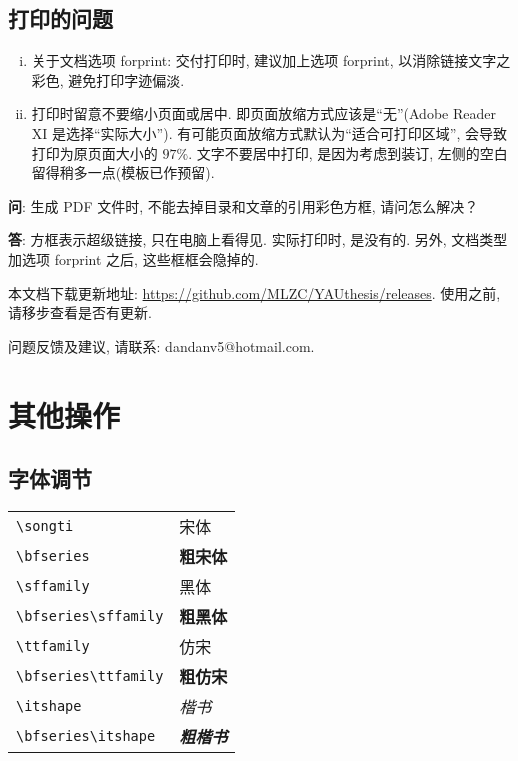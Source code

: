 \documentclass[forprint]{YAUthesis}
\begin{document}
\section{打印的问题}
\begin{enumerate}[i)]
  \item  关于文档选项 forprint: 交付打印时, 建议加上选项 forprint, 以消除链接文字之彩色, 避免打印字迹偏淡.
  \item  打印时留意不要缩小页面或居中. 即页面放缩方式应该是``无''(Adobe Reader XI 是选择``实际大小'').
           有可能页面放缩方式默认为``适合可打印区域'', 会导致打印为原页面大小的 $97\%$.
           文字不要居中打印, 是因为考虑到装订, 左侧的空白留得稍多一点(模板已作预留).
\end{enumerate}

\textbf{问}: {\kaishu 生成 PDF 文件时, 不能去掉目录和文章的引用彩色方框, 请问怎么解决？}

\textbf{答}: {\kaishu 方框表示超级链接, 只在电脑上看得见. 实际打印时, 是没有的. 另外, 文档类型加选项 forprint 之后, 这些框框会隐掉的. }

 \vfill

本文档下载更新地址: \url{https://github.com/MLZC/YAUthesis/releases}. 使用之前, 请移步查看是否有更新.

问题反馈及建议, 请联系: dandanv5@hotmail.com.



\chapter{其他操作}


 \section{字体调节}

\begin{tabular}{ll}
	\verb|\songti|   & {\songti 宋体}   \\
	\verb|\bfseries|    & {\bfseries 粗宋体}    \\
	\verb|\sffamily| & {\sffamily 黑体} \\
	\verb|\bfseries\sffamily| & {\bfseries\sffamily 粗黑体} \\
  \verb|\ttfamily|   & {\ttfamily 仿宋}   \\
  \verb|\bfseries\ttfamily|   & {\bfseries\ttfamily 粗仿宋}   \\
  \verb|\itshape|   & {\itshape 楷书}   \\
  \verb|\bfseries\itshape|   & {\bfseries\itshape 粗楷书}   \\

\end{tabular}
\textbf{}
\end{document}
